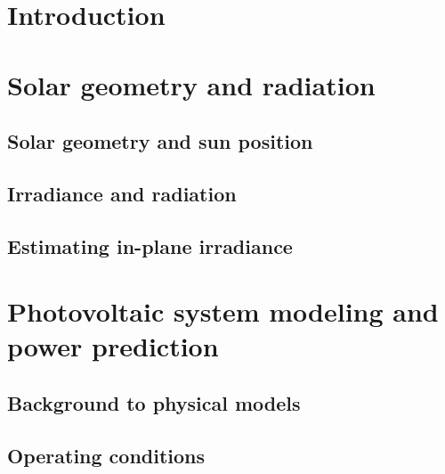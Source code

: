 \documentclass[german,a4paper,12pt,oneside]{article}
\begin{document}

\newpage
    

\newpage


\newpage

\tableofcontents
\newpage

\section{Introduction}

\newpage

\section{Solar geometry and radiation}

\label{sec:Solar Geometry and Radiation}
\subsection{Solar geometry and sun position}

\label{sec:Solar Geometry}
\subsection{Irradiance and radiation}
\label{sec:Irradiance and Radiation}

\subsection{Estimating in-plane irradiance}
\label{sec:Estimating in-plane irradiance}

\newpage

\section{Photovoltaic system modeling and power prediction}
\label{sec:Photovoltaic system modeling and power prediction}

\subsection{Background to physical models}

\label{sec:Background to physical models}
\subsection{Operating conditions}

\label{sec:Operating_conditions}
\end{document}
